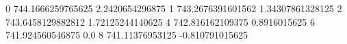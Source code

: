 0 744.1666259765625 2.2420654296875
1 743.2676391601562 1.34307861328125
2 743.6458129882812 1.72125244140625
4 742.816162109375 0.8916015625
6 741.924560546875 0.0
8 741.11376953125 -0.810791015625
